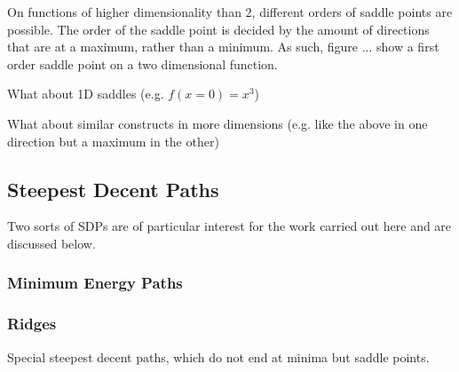 On functions of higher dimensionality than $2$, different orders of saddle points are possible.
The order of the saddle point is decided by the amount of directions that are at a maximum, rather than a minimum.
As such, figure ... show a first order saddle point on a two dimensional function.

\bit
\item What about 1D saddles (e.g. $f(x = 0) = x^3$)
\item What about similar constructs in more dimensions (e.g. like the above in one direction but a maximum in the other)
\eit

\recent

\incomplete

\subsection{Steepest Decent Paths}
\label{sec:sdps}


\placeholder

Two sorts of SDPs are of particular interest for the work carried out here and are discussed below.

\subsubsection{Minimum Energy Paths}
\label{sec:meps}

\placeholder

\subsubsection{Ridges}
\label{sec:ridges}

Special steepest decent paths, which do not end at minima but saddle points.

\placeholder


